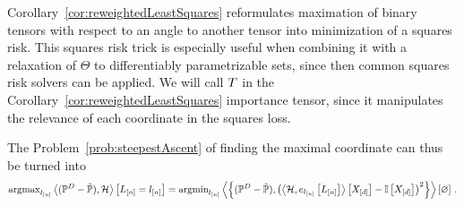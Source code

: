 Corollary~\ref{cor:reweightedLeastSquares} reformulates maximation of binary tensors with respect to an angle to another tensor into minimization of a squares risk.
This squares risk trick is especially useful when combining it with a relaxation of $\Theta$ to differentiably parametrizable sets, since then common squares risk solvers can be applied.
We will call $T$ in the Corollary~\ref{cor:reweightedLeastSquares} importance tensor, since it manipulates the relevance of each coordinate in the squares loss.

\begin{example}
	The Problem~\ref{prob:steepestAscent} of finding the maximal coordinate can thus be turned into
	\begin{align*}
		\mathrm{argmax}_{l_{[n]}} \left\langle (\mathbb{P}^{D}-\tilde{\mathbb{P}}),\mathcal{H}\right\rangle \left[ L_{[n]}=l_{[n]} \right]  
		= \mathrm{argmin}_{l_{[n]}} \left\langle \left\{(\mathbb{P}^{D}-\tilde{\mathbb{P}}),
		\left(\left\langle \mathcal{H},e_{l_{[n]}}\left[L_{[n]}\right]\right\rangle \left[ X_{[d]} \right]-\mathbb{I}\left[X_{[d]}\right]\right)^2\right\}\right\rangle \left[ \varnothing \right] \, . 
	\end{align*}
\end{example}



%
%



